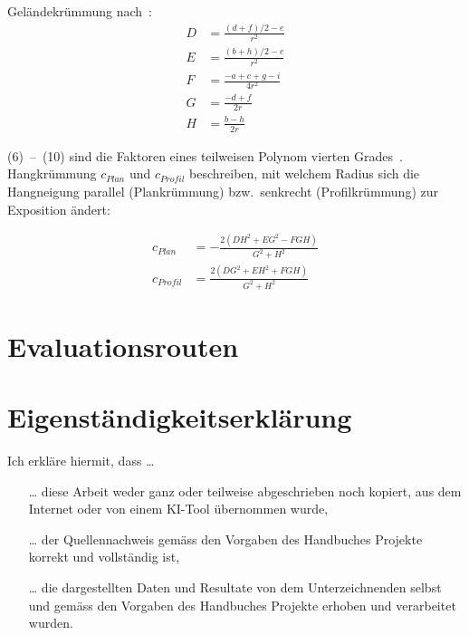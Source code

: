 Geländekrümmung nach~\cite{gismath}:
\begin{align}
  D &= \frac{{(d + f) / 2 - e}}{{r^2}} \\
  E &= \frac{{(b + h) / 2 - e}}{{r^2}} \\
  F &= \frac{{-a + c + g - i}}{{4r^2}} \\
  G &= \frac{{-d + f}}{{2r}} \\
  H &= \frac{{b - h}}{{2r}}
\end{align}

(6)~--~(10) sind die Faktoren eines teilweisen Polynom vierten Grades~\cite{gismath}.
Hangkrümmung $c_{Plan}$ und $c_{Profil}$ beschreiben, mit welchem Radius sich die Hangneigung parallel (Plankrümmung) bzw.\ senkrecht (Profilkrümmung) zur Exposition ändert:

\begin{align}
    c_{Plan} &= -\frac{{2(DH^2 + EG^2 - FGH)}}{{G^2 + H^2}}
    \\
    c_{Profil} &= \frac{{2(DG^2 + EH^2 + FGH)}}{{G^2 + H^2}}
\end{align}

\section{Evaluationsrouten}\label{app:evalroutes}










\section{Eigenständigkeitserklärung}
Ich erkläre hiermit, dass \ldots
\begin{itemize}
  \item[\ldots] diese Arbeit weder ganz oder teilweise abgeschrieben noch kopiert, aus dem Internet oder von einem KI-Tool übernommen wurde,
  \item[\ldots] der Quellennachweis gemäss den Vorgaben des Handbuches Projekte korrekt und vollständig ist,
  \item[\ldots] die dargestellten Daten und Resultate von dem Unterzeichnenden selbst und gemäss den Vorgaben des Handbuches Projekte erhoben und verarbeitet wurden.
\end{itemize}

